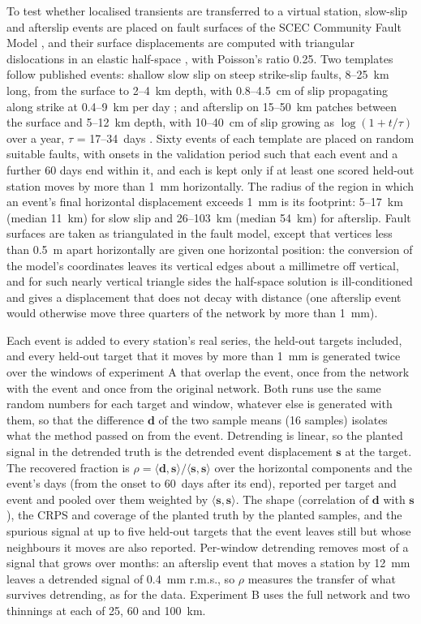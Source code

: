 \documentclass[preprint,12pt,authoryear]{elsarticle}
\begin{document}
To test whether localised transients are transferred to a virtual station, slow-slip and
afterslip events are placed on fault surfaces of the SCEC Community Fault Model
\citep{plesch2007,plesch2024cfm}, and their surface displacements are computed with
triangular dislocations in an elastic half-space \citep{nikkhoo2015}, with Poisson's
ratio 0.25. Two templates follow published events: shallow slow slip on steep strike-slip
faults, 8--25~km long, from the surface to 2--4~km depth, with 0.8--4.5~cm of slip
propagating along strike at 0.4--9~km per day \citep{materna2024,vavra2024}; and
afterslip on 15--50~km patches between the surface and 5--12~km depth, with 10--40~cm of
slip growing as $\log(1 + t/\tau)$ over a year, $\tau$ = 17--34~days
\citep{gonzalezortega2014}. Sixty events of each template are placed on random suitable
faults, with onsets in the validation period such that each event and a further 60 days
end within it, and each is kept only if at least one scored held-out station moves by
more than 1~mm horizontally. The radius of the region in which an event's final
horizontal displacement exceeds 1~mm is its footprint: 5--17~km (median 11~km) for slow
slip and 26--103~km (median 54~km) for afterslip. Fault surfaces are taken as
triangulated in the fault model, except that vertices less than 0.5~m apart horizontally
are given one horizontal position: the conversion of the model's coordinates leaves its
vertical edges about a millimetre off vertical, and for such nearly vertical triangle
sides the half-space solution is ill-conditioned and gives a displacement that does not
decay with distance (one afterslip event would otherwise move three quarters of the
network by more than 1~mm).

Each event is added to every station's real series, the held-out targets included, and
every held-out target that it moves by more than 1~mm is generated twice over the windows
of experiment A that overlap the event, once from the network with the event and once
from the original network. Both runs use the same random numbers for each target and
window, whatever else is generated with them, so that the difference $\mathbf{d}$ of the
two sample means (16 samples) isolates what the method passed on from the event.
Detrending is linear, so the planted signal in the detrended truth is the detrended event
displacement $\mathbf{s}$ at the target. The recovered fraction is $\rho =
\langle\mathbf{d}, \mathbf{s}\rangle / \langle\mathbf{s}, \mathbf{s}\rangle$ over the
horizontal components and the event's days (from the onset to 60~days after its end),
reported per target and event and pooled over them weighted by $\langle\mathbf{s},
\mathbf{s}\rangle$. The shape (correlation of $\mathbf{d}$ with $\mathbf{s}$), the CRPS
and coverage of the planted truth by the planted samples, and the spurious signal at up
to five held-out targets that the event leaves still but whose neighbours it moves are
also reported. Per-window detrending removes most of a signal that grows over months: an
afterslip event that moves a station by 12~mm leaves a detrended signal of 0.4~mm r.m.s.,
so $\rho$ measures the transfer of what survives detrending, as for the data. Experiment
B uses the full network and two thinnings at each of 25, 60 and 100~km.
\end{document}
